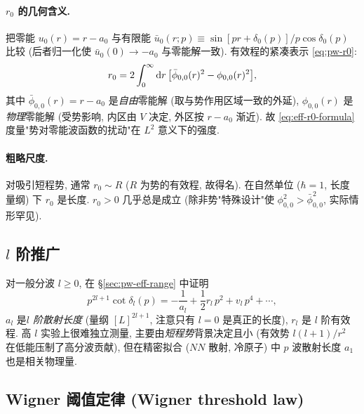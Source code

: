 \paragraph{$r_0$ 的几何含义.}\quad 把零能 $u_0(r)=r-a_0$ 与有限能 $\bar u_0(r;p)\equiv\sin[pr+\delta_0(p)]/p\cos\delta_0(p)$ 比较 (后者归一化使 $\bar u_0(0)\to-a_0$ 与零能解一致). 有效程的紧凑表示 \eqref{eq:pw-r0}:
\begin{equation}
  r_0=2\int_0^\infty\mathrm{d} r\,\bigl[\bar\phi_{0,0}(r)^2-\phi_{0,0}(r)^2\bigr],
  \label{eq:eff-r0-formula}
\end{equation}
其中 $\bar\phi_{0,0}(r)=r-a_0$ 是\emph{自由}零能解 (取与势作用区域一致的外延), $\phi_{0,0}(r)$ 是\emph{物理}零能解 (受势影响, 内区由 $V$ 决定, 外区按 $r-a_0$ 渐近). 故 \eqref{eq:eff-r0-formula} 度量"势对零能波函数的扰动"在 $L^2$ 意义下的强度.

\paragraph{粗略尺度.}\quad 对吸引短程势, 通常 $r_0\sim R$ ($R$ 为势的有效程, 故得名). 在自然单位 ($\hbar=1$, 长度量纲) 下 $r_0$ 是长度. $r_0>0$ 几乎总是成立 (除非势"特殊设计"使 $\phi_{0,0}^2>\bar\phi_{0,0}^2$, 实际情形罕见).

\subsection{$l$ 阶推广}\label{sec:eff-range-l}

对一般分波 $l\ge 0$, 在 \S\ref{sec:pw-eff-range} 中证明
\begin{equation}
  p^{2l+1}\cot\delta_l(p)=-\frac{1}{a_l}+\frac{1}{2}r_l\,p^2+v_l\,p^4+\cdots,
  \label{eq:eff-bethe-l}
\end{equation}
$a_l$ 是\emph{$l$ 阶散射长度} (量纲 $[L]^{2l+1}$, 注意只有 $l=0$ 是真正的长度), $r_l$ 是 $l$ 阶有效程. 高 $l$ 实验上很难独立测量, 主要由\emph{短程势}背景决定且小 (有效势 $l(l+1)/r^2$ 在低能压制了高分波贡献), 但在精密拟合 ($NN$ 散射, 冷原子) 中 $p$ 波散射长度 $a_1$ 也是相关物理量.

\subsection{Wigner 阈值定律 (Wigner threshold law)}\label{sec:eff-range-Wigner}

